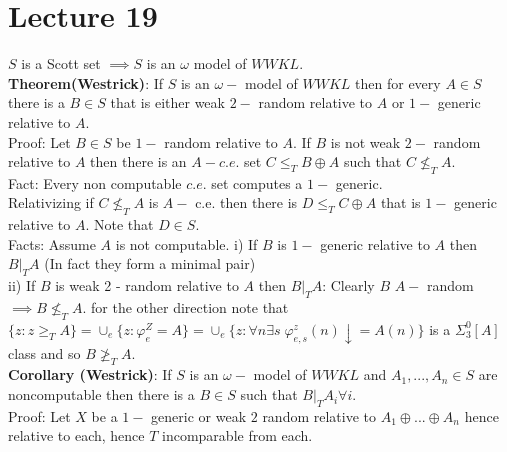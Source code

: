 \documentclass{article}
\begin{document}
      \section{Lecture 19}
      $S$ is a Scott set $\implies  S$ is an $\omega$ model of $WWKL$.\\
      \textbf{Theorem(Westrick)}: If $S$ is an $\omega-$ model of $WWKL$ then for every $A \in S$ there is a $B \in S$ that is either weak $2-$ random relative to $A$ or $1-$ generic relative to $A$.\\
      Proof: Let $B\in S$ be $1-$ random relative to $A$. If $B$ is not weak $2-$ random relative to $A$ then there is an $A-c.e.$ set $C \leq_T B \oplus A$ such that $C \not \leq_T A$.\\
      Fact: Every non computable $c.e.$ set computes a $1-$ generic.\\
      Relativizing if $C \not \leq_TA$ is $A-$ c.e. then there is $D \leq_TC \oplus A$ that is $1-$ generic relative to $A$. Note that $ D \in S$. \\
      Facts: Assume $A$ is not computable. i) If $B$ is $1-$ generic relative to $A$ then $B |_T A$ (In fact they form a minimal pair)\\
      ii) If $B$ is weak 2 - random relative to $A$ then $B |_T A$: 
      Clearly $B$ $A-$ random $\implies B \not \leq_T A$. for the other direction note that $\{z: z \geq_TA\} = \cup_e \{z : \varphi_e^Z = A\} = \cup_e \{z : \forall n \exists s \; \varphi_{e,s}^z(n) \downarrow = A(n)\}$ is a $\Sigma^0_3[A]$ class and so $B \not \geq_T A$.\\
      \textbf{Corollary (Westrick)}: If $S$ is an $\omega-$ model of $WWKL$ and $A_1,...,A_n \in S$ are noncomputable then there is a $B\in S$ such that $B |_T A_i \forall i$.\\
      Proof: Let $X$ be a $1-$ generic or weak $2$ random relative to $A_1 \oplus ...\oplus A_n$ hence relative to each, hence $T$ incomparable from each. 
\end{document}
